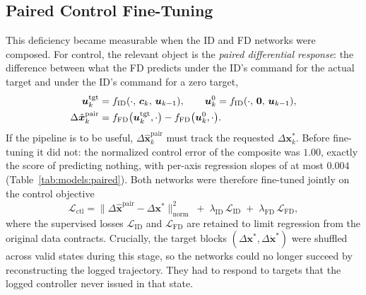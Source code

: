 \subsection{Paired Control Fine-Tuning}
\label{sec:models:id-paired}

This deficiency became measurable when the ID and FD networks were composed.
For control, the relevant object is the \emph{paired differential response}:
the difference between what the FD predicts under the ID's command for the
actual target and under the ID's command for a zero target,
%
\begin{align}
  \bm{u}^{\mathrm{tgt}}_k &= f_{\mathrm{ID}}(\cdot,\, \bm{c}_k,\, \bm{u}_{k-1}),
  \qquad
  \bm{u}^{0}_k = f_{\mathrm{ID}}(\cdot,\, \bm{0},\, \bm{u}_{k-1}), \notag \\
  \Delta\hat{\bm{x}}^{\mathrm{pair}}_k &=
    f_{\mathrm{FD}}\bigl(\bm{u}^{\mathrm{tgt}}_k, \cdot\bigr)
  - f_{\mathrm{FD}}\bigl(\bm{u}^{0}_k, \cdot\bigr).
  \label{eq:models:paired}
\end{align}
%
If the pipeline is to be useful, $\Delta\hat{\bm{x}}^{\mathrm{pair}}_k$ must
track the requested $\Delta\bm{x}^{*}_k$. Before fine-tuning it did not: the
normalized control error of the composite was $1.00$, exactly the score of predicting nothing, with per-axis regression slopes of at most $0.004$
(Table~\ref{tab:models:paired}). Both networks were therefore fine-tuned
jointly on the control objective
%
\begin{equation}
  \label{eq:models:paired-loss}
  \mathcal{L}_{\mathrm{ctl}} =
  \bigl\| \Delta\hat{\bm{x}}^{\mathrm{pair}}
        - \Delta\bm{x}^{*} \bigr\|^2_{\mathrm{norm}}
  \;+\; \lambda_{\mathrm{ID}}\,\mathcal{L}_{\mathrm{ID}}
  \;+\; \lambda_{\mathrm{FD}}\,\mathcal{L}_{\mathrm{FD}},
\end{equation}
%
where the supervised losses $\mathcal{L}_{\mathrm{ID}}$ and
$\mathcal{L}_{\mathrm{FD}}$ are retained to limit regression from the
original data contracts. Crucially, the target blocks
$(\Delta\bm{x}^{*}, \Delta\dot{\bm{x}}^{*})$ were shuffled across valid
states during this stage, so the networks could no longer succeed by
reconstructing the logged trajectory. They had to respond to targets that the
logged controller never issued in that state.

